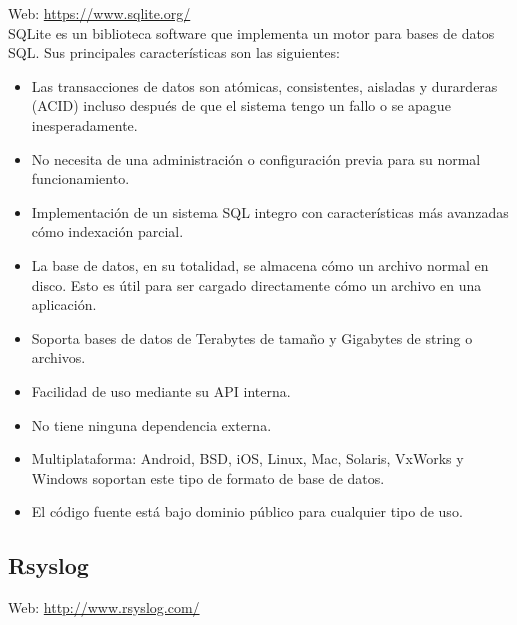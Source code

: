 Web: \url{https://www.sqlite.org/}\\

SQLite es un biblioteca software que implementa un motor para bases de datos SQL. Sus principales características son las siguientes:

\begin{itemize}
\item Las transacciones de datos son atómicas, consistentes, aisladas y durarderas (ACID) incluso después de que el sistema tengo un fallo o se apague inesperadamente.
\item No necesita de una administración o configuración previa para su normal funcionamiento.
\item Implementación de un sistema SQL integro con características más avanzadas cómo indexación parcial.
\item La base de datos, en su totalidad, se almacena cómo un archivo normal en disco. Esto es útil para ser cargado directamente cómo un archivo en una aplicación.
\item Soporta bases de datos de Terabytes de tamaño y Gigabytes de string o archivos.
\item Facilidad de uso mediante su API interna.
\item No tiene ninguna dependencia externa.
\item Multiplataforma: Android, BSD, iOS, Linux, Mac, Solaris, VxWorks y Windows soportan este tipo de formato de base de datos.
\item El código fuente está bajo dominio público para cualquier tipo de uso.
\end{itemize}

\subsection{Rsyslog}

Web: \url{http://www.rsyslog.com/}\\

